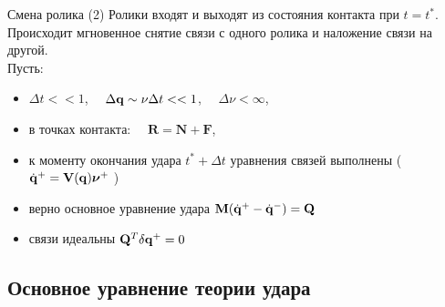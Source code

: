 \documentclass{beamer}
\begin{document}
\begin{frame}{Смена ролика}
    \textcolor{Periwinkle}{(2) Ролики входят и выходят из состояния контакта при $t = t^*$.}\\
    Происходит мгновенное снятие связи с одного ролика и наложение связи на другой.\\
    Пусть:
    \begin{itemize}
        \item $\Delta t << 1$, $\quad \Delta \mathbf{q} \sim \nu\Delta t << 1$, $\quad \Delta \nu < \infty$,
        \item в точках контакта: $\quad \mathbf{R} = \mathbf{N} + \mathbf{F}$,
        \item к моменту окончания удара $t^*+\Delta t$ уравнения связей выполнены (\enspace $\dot{\mathbf{q}}^+ = \mathbf{V}(\mathbf{q})\boldsymbol{\mathbf{\nu}}^+ \ $)
        \item верно основное уравнение удара \enspace $\mathbf{M} (\dot{\mathbf{q}}^+ - \dot{\mathbf{q}}^-) = \mathbf{Q}$
        \item связи идеальны \enspace $\mathbf{Q}^T\delta\mathbf{q}^+ = 0$
    \end{itemize}
\end{frame}

\subsection{Основное уравнение теории удара}
\end{document}
